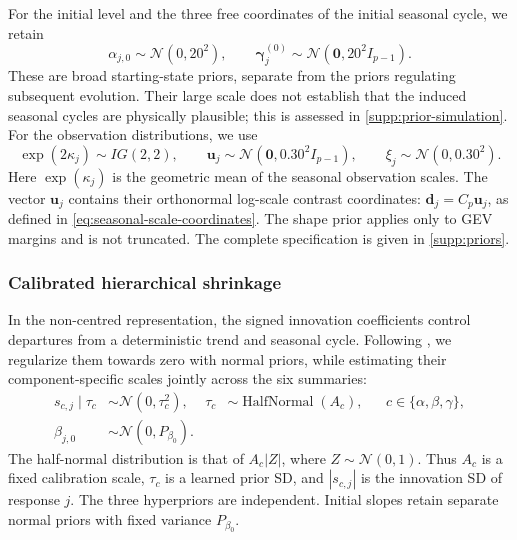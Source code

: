 \documentclass[11pt,a4paper]{article}
\newcommand{\N}{\mathcal N}
\begin{document}
For the initial level and the three free coordinates of the initial seasonal
cycle, we retain
\begin{equation}\label{eq:initial-state-priors}
\alpha_{j,0}\sim\N(0,20^2),
\qquad
\bm\gamma^{(0)}_j\sim\N(\bm0,20^2 I_{p-1}).
\end{equation}
These are broad starting-state priors, separate from the priors regulating
subsequent evolution. Their large scale does not establish that the induced
seasonal cycles are physically plausible; this is assessed in
\cref{supp:prior-simulation}. For the observation distributions, we use
\begin{equation}\label{eq:observation-priors}
\exp(2\kappa_j)\sim IG(2,2),
\qquad
\bm u_j\sim\N(\bm0,0.30^2I_{p-1}),
\qquad
\xi_j\sim\N(0,0.30^2).
\end{equation}
Here \(\exp(\kappa_j)\) is the geometric mean of the seasonal observation
scales. The vector \(\bm u_j\) contains their orthonormal log-scale contrast
coordinates: \(\bm d_j=C_p\bm u_j\), as defined in
\cref{eq:seasonal-scale-coordinates}. The shape prior applies only to GEV
margins and is not truncated. The complete specification is given in
\cref{supp:priors}.

\subsubsection{Calibrated hierarchical shrinkage}\label{subsubsec:shrinkage}

In the non-centred representation, the signed innovation coefficients
control departures from a deterministic trend and seasonal cycle. Following
\citet{fruhwirthschnatter2010}, we regularize them towards zero with normal
priors, while estimating their component-specific scales jointly across the
six summaries:
\begin{equation}\label{eq:shrinkage-prior}
\begin{aligned}
s_{c,j}\mid\tau_c&\sim\N(0,\tau_c^2),
&\tau_c&\sim\operatorname{HalfNormal}(A_c),
&&c\in\{\alpha,\beta,\gamma\},\\
\beta_{j,0}&\sim\N(0,P_{\beta_0}).
\end{aligned}
\end{equation}
The half-normal distribution is that of \(A_c|Z|\), where
\(Z\sim\N(0,1)\). Thus \(A_c\) is a fixed calibration scale,
\(\tau_c\) is a learned prior SD, and \(|s_{c,j}|\) is the innovation
SD of response \(j\). The three hyperpriors are independent. Initial
slopes retain separate normal priors with fixed variance \(P_{\beta_0}\).
\end{document}

